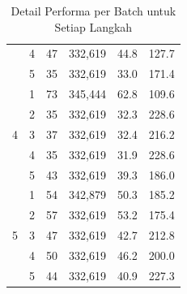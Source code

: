 \begin{table}[h!]
\begin{tabular}{|c|c|c|c|c|c|}
                       & 4              & 47                   & 332,619               & 44.8                            & 127.7              \\
                       & 5              & 35                   & 332,619               & 33.0                            & 171.4              \\
    \hline
    \multirow{5}{*}{4} & 1              & 73                   & 345,444               & 62.8                            & 109.6              \\
                       & 2              & 35                   & 332,619               & 32.3                            & 228.6              \\
                       & 3              & 37                   & 332,619               & 32.4                            & 216.2              \\
                       & 4              & 35                   & 332,619               & 31.9                            & 228.6              \\
                       & 5              & 43                   & 332,619               & 39.3                            & 186.0              \\
    \hline
    \multirow{5}{*}{5} & 1              & 54                   & 342,879               & 50.3                            & 185.2              \\
                       & 2              & 57                   & 332,619               & 53.2                            & 175.4              \\
                       & 3              & 47                   & 332,619               & 42.7                            & 212.8              \\
                       & 4              & 50                   & 332,619               & 46.2                            & 200.0              \\
                       & 5              & 44                   & 332,619               & 40.9                            & 227.3              \\
    \hline
  \end{tabular}
  \caption{Detail Performa per Batch untuk Setiap Langkah}
  \label{tab:batch_details}
\end{table}

